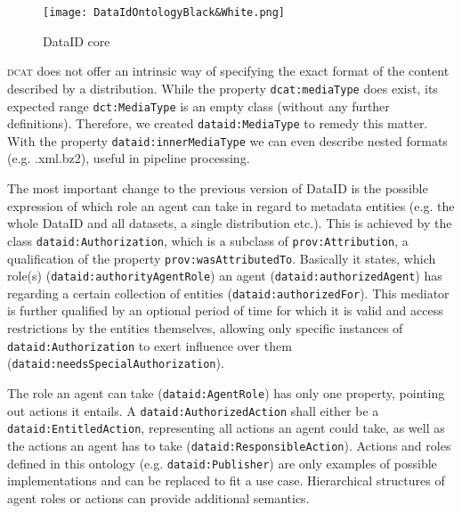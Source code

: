 \documentclass[runningheads,a4paper]{llncs}
\newcommand{\dcat}{{\scshape dcat}\xspace}
\newcommand{\prop}[1]{{{\texttt{#1}}}}
\begin{document}
\begin{figure}
\centering
  \texttt{[image: DataIdOntologyBlack\&White.png]}
  \caption{DataID core}
  \label{fig:core}
  \vspace{-1.5em}
\end{figure}

\dcat does not offer an intrinsic way of specifying the exact format of the content described by a distribution. While the property \prop{dcat:mediaType} does exist, its expected range \prop{dct:MediaType} is an empty class (without any further definitions).
Therefore, we created \prop{dataid:MediaType} to remedy this matter. With the property \prop{dataid:innerMediaType} we can even describe nested formats (e.g. .xml.bz2), useful in pipeline processing.

The most important change to the previous version of DataID is the possible expression of which role an agent can take in regard to metadata entities (e.g. the whole DataID and all datasets, a single distribution etc.). This is achieved by the class \prop{dataid:Authorization}, which is a subclass of \prop{prov:Attribution}, a qualification of the property \prop{prov:wasAttributedTo}. Basically it states, which role(s) (\prop{dataid:authorityAgentRole}) an agent (\prop{dataid:authorizedAgent}) has regarding a certain collection of entities (\prop{dataid:authorizedFor}). This mediator is further qualified by an optional period of time for which it is valid and access restrictions by the entities themselves, allowing only specific instances of \prop{dataid:Authorization} to exert influence over them (\prop{dataid:needsSpecialAuthorization}).


The role an agent can take (\prop{dataid:AgentRole}) has only one property, pointing out actions it entails. A \prop{dataid:AuthorizedAction} shall either be a \prop{dataid:EntitledAction}, representing all actions an agent could take, as well as the actions an agent has to take (\prop{dataid:ResponsibleAction}). Actions and roles defined in this ontology (e.g. \prop{dataid:Publisher}) are only examples of possible implementations and can be replaced to fit a use case.
Hierarchical structures of agent roles or actions can provide additional semantics.
\end{document}
